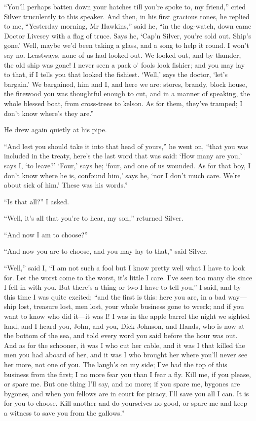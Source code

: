 \enquote{You’ll perhaps batten down your hatches till you’re spoke to, my friend,} cried Silver truculently to this speaker. And then, in his first gracious tones, he replied to me, \enquote{Yesterday morning, Mr Hawkins,} said he, \enquote{in the dog-watch, down came Doctor Livesey with a flag of truce. Says he, ‘Cap’n Silver, you’re sold out. Ship’s gone.’ Well, maybe we’d been taking a glass, and a song to help it round. I won’t say no. Leastways, none of us had looked out. We looked out, and by thunder, the old ship was gone! I never seen a pack o’ fools look fishier; and you may lay to that, if I tells you that looked the fishiest. ‘Well,’ says the doctor, ‘let’s bargain.’ We bargained, him and I, and here we are: stores, brandy, block house, the firewood you was thoughtful enough to cut, and in a manner of speaking, the whole blessed boat, from cross-trees to kelson. As for them, they’ve tramped; I don’t know where’s they are.}

He drew again quietly at his pipe.

\enquote{And lest you should take it into that head of yours,} he went on, \enquote{that you was included in the treaty, here’s the last word that was said: \enquote{How many are you,} says I, \enquote{to leave?} \enquote{Four,} says he; \enquote{four, and one of us wounded. As for that boy, I don’t know where he is, confound him,} says he, \enquote{nor I don’t much care. We’re about sick of him.} These was his words.}

\enquote{Is that all?} I asked.

\enquote{Well, it’s all that you’re to hear, my son,} returned Silver.

\enquote{And now I am to choose?}

\enquote{And now you are to choose, and you may lay to that,} said Silver.

\enquote{Well,} said I, \enquote{I am not such a fool but I know pretty well what I have to look for. Let the worst come to the worst, it’s little I care. I’ve seen too many die since I fell in with you. But there’s a thing or two I have to tell you,} I said, and by this time I was quite excited; \enquote{and the first is this: here you are, in a bad way---ship lost, treasure lost, men lost, your whole business gone to wreck; and if you want to know who did it---it was I! I was in the apple barrel the night we sighted land, and I heard you, John, and you, Dick Johnson, and Hands, who is now at the bottom of the sea, and told every word you said before the hour was out. And as for the schooner, it was I who cut her cable, and it was I that killed the men you had aboard of her, and it was I who brought her where you’ll never see her more, not one of you. The laugh’s on my side; I’ve had the top of this business from the first; I no more fear you than I fear a fly. Kill me, if you please, or spare me. But one thing I’ll say, and no more; if you spare me, bygones are bygones, and when you fellows are in court for piracy, I’ll save you all I can. It is for you to choose. Kill another and do yourselves no good, or spare me and keep a witness to save you from the gallows.}

